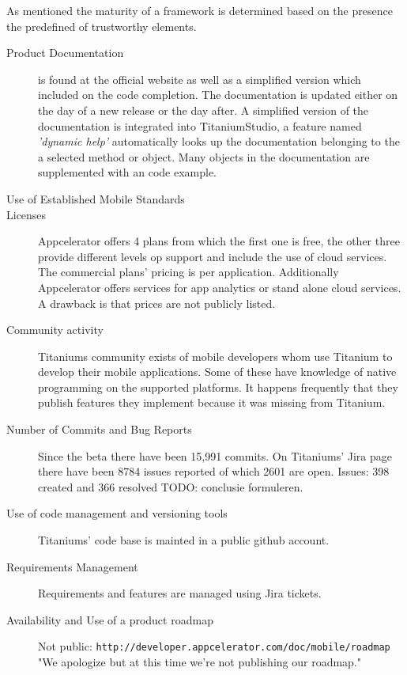 As mentioned the maturity of a framework is determined based on the presence the predefined of trustworthy elements.

\begin{description}
\item [Product Documentation] is found at the official website as well as a simplified version which included on the code completion. 
The documentation is updated either on the day of a new release or the day after. %
A simplified version of the documentation is integrated into TitaniumStudio, a feature named \emph{'dynamic help'} automatically looks up the documentation belonging to the a selected method or object.
Many objects in the documentation are supplemented with an code example.
\item [Use of Established Mobile Standards] 
\item [Licenses] Appcelerator offers 4 plans from which the first one is free, the other three provide different levels op support and include the use of cloud services. The commercial plans' pricing is per application. Additionally Appcelerator offers services for app analytics or stand alone cloud services. A drawback is that prices are not publicly listed.
\item [Community activity] Titaniums community exists of mobile developers whom use Titanium to develop their mobile applications. Some of these have knowledge of native programming on the supported platforms. It happens frequently that they publish features they implement because it was missing from Titanium. 
\item [Number of Commits and Bug Reports] Since the beta there have been 15,991 commits. %
On Titaniums' Jira page there have been 8784 issues reported of which 2601 are open.
Issues: 398 created and 366 resolved
TODO: conclusie formuleren.
\item [Use of code management and versioning tools] Titaniums' code base is mainted in a public github account.%
\item [Requirements Management] Requirements and features are managed using Jira tickets.
\item [Availability and Use of a product roadmap] Not public:
\texttt{http://developer.appcelerator.com/doc/mobile/roadmap}
"We apologize but at this time we're not publishing our roadmap."
\end{description}

